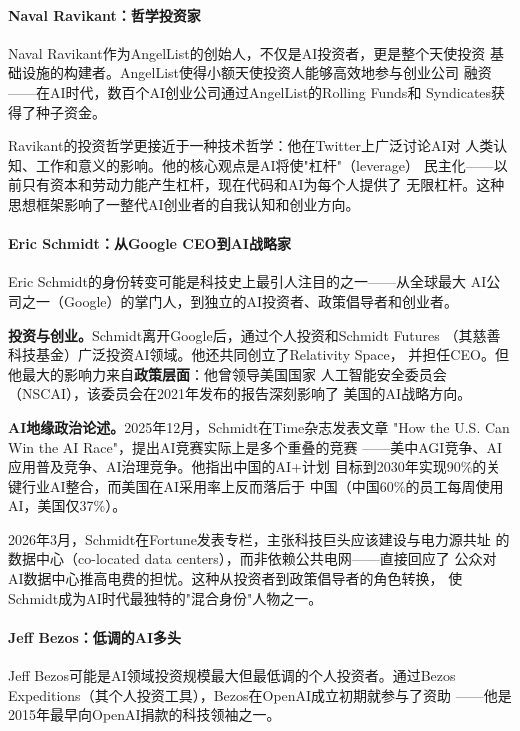 \paragraph{Naval Ravikant：哲学投资家}

Naval Ravikant作为AngelList的创始人，不仅是AI投资者，更是整个天使投资
基础设施的构建者。AngelList使得小额天使投资人能够高效地参与创业公司
融资——在AI时代，数百个AI创业公司通过AngelList的Rolling Funds和
Syndicates获得了种子资金。

Ravikant的投资哲学更接近于一种技术哲学：他在Twitter上广泛讨论AI对
人类认知、工作和意义的影响。他的核心观点是AI将使"杠杆"（leverage）
民主化——以前只有资本和劳动力能产生杠杆，现在代码和AI为每个人提供了
无限杠杆。这种思想框架影响了一整代AI创业者的自我认知和创业方向。

\paragraph{Eric Schmidt：从Google CEO到AI战略家}

Eric Schmidt的身份转变可能是科技史上最引人注目的之一——从全球最大
AI公司之一（Google）的掌门人，到独立的AI投资者、政策倡导者和创业者。

\textbf{投资与创业。}Schmidt离开Google后，通过个人投资和Schmidt Futures
（其慈善科技基金）广泛投资AI领域。他还共同创立了Relativity Space，
并担任CEO。但他最大的影响力来自\textbf{政策层面}：他曾领导美国国家
人工智能安全委员会（NSCAI），该委员会在2021年发布的报告深刻影响了
美国的AI战略方向。

\textbf{AI地缘政治论述。}2025年12月，Schmidt在Time杂志发表文章
"How the U.S. Can Win the AI Race"，提出AI竞赛实际上是多个重叠的竞赛
——美中AGI竞争、AI应用普及竞争、AI治理竞争。他指出中国的AI+计划
目标到2030年实现90\%的关键行业AI整合，而美国在AI采用率上反而落后于
中国（中国60\%的员工每周使用AI，美国仅37\%）。

2026年3月，Schmidt在Fortune发表专栏，主张科技巨头应该建设与电力源共址
的数据中心（co-located data centers），而非依赖公共电网——直接回应了
公众对AI数据中心推高电费的担忧。这种从投资者到政策倡导者的角色转换，
使Schmidt成为AI时代最独特的"混合身份"人物之一。

\paragraph{Jeff Bezos：低调的AI多头}

Jeff Bezos可能是AI领域投资规模最大但最低调的个人投资者。通过Bezos
Expeditions（其个人投资工具），Bezos在OpenAI成立初期就参与了资助
——他是2015年最早向OpenAI捐款的科技领袖之一。

